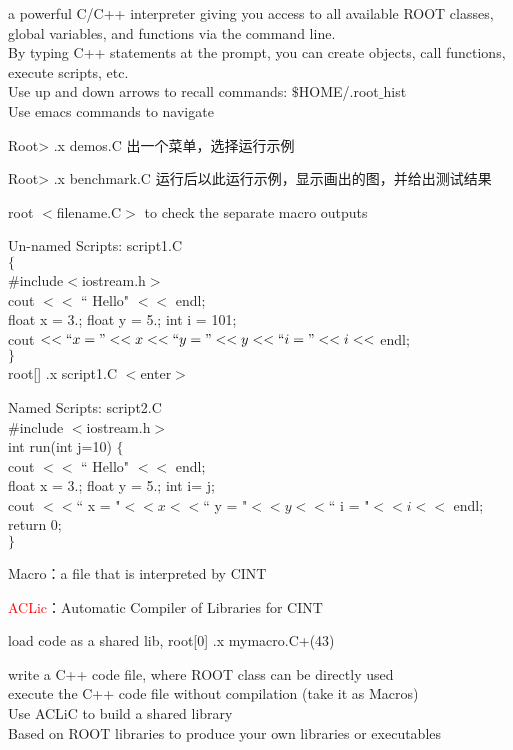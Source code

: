 \documentclass[12pt,a4paper]{article}
\begin{document}
a powerful C/C++ interpreter giving you access to all available ROOT classes, global variables, and functions via the command line. \\
By typing C++ statements at the prompt, you can create objects, call functions, execute scripts, etc. \\
Use up and down arrows to recall commands: $\$$HOME/.root$\_$hist \\
Use emacs commands to navigate

Root> .x demos.C 出一个菜单，选择运行示例

Root> .x benchmark.C 运行后以此运行示例，显示画出的图，并给出测试结果

root $<$filename.C$>$ to check the separate macro outputs

Un-named Scripts: script1.C \\
$\{$ \\
$\#$include$<$iostream.h$>$ \\
cout $<<$ `` Hello" $<<$ endl; \\
float x = 3.; float y = 5.; int i = 101; \\
cout $<<`` x = "<<x<<`` y = "<<y<<`` i = "<<i<<$ endl; \\
$\}$ \\
root[] .x script1.C $<$enter$>$
 
Named Scripts: script2.C \\
$\#$include $<$iostream.h$>$ \\
int run(int j=10) $\{$ \\
cout $<<$ `` Hello" $<<$ endl; \\
float x = 3.; float y = 5.; int i= j; \\
cout $<<$`` x = "$<< x <<$`` y = "$<< y <<$`` i = "$<< i <<$ endl; \\
return 0; \\
$\}$
 
 Macro：a file that is interpreted by CINT
 
\textcolor{red}{ACLic}：Automatic Compiler of Libraries for CINT
 
 load code as a shared lib, 
 root[0] .x mymacro.C+(43)
 
write a C++ code file, where ROOT class can be directly used \\
execute the C++ code file without compilation (take it as Macros) \\
Use ACLiC to build a shared library \\
Based on ROOT libraries to produce your own libraries or executables
 
\end{document}
